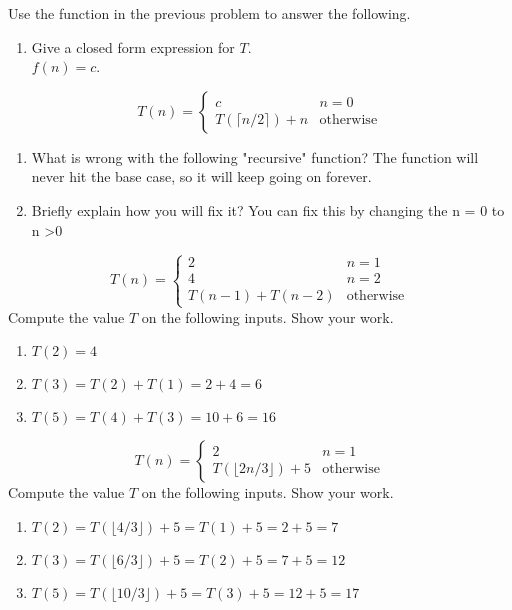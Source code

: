 \documentclass[12pt]{article}
\newenvironment{problem}[2][Problem]{\begin{trivlist}
\item[\hskip \labelsep {\bfseries #1}\hskip \labelsep {\bfseries #2.}]}{\end{trivlist}}
\begin{document}
\begin{problem}{4}
Use the function in the previous problem to answer the following.
\begin{enumerate}
 \item Give a closed form expression for $T$.\\
 $f(n) = c$.
\end{enumerate}
\end{problem}

\begin{problem}{5}
$$T(n) = \begin{cases}
      c  & n = 0 \\
      T(\lceil n/2 \rceil) + n & \text{otherwise}
 \end{cases}$$
 
\begin{enumerate}
\item What is wrong with the following "recursive" function? \newline 
    The function will never hit the base case, so it will keep going on forever.
\item Briefly explain how you will fix it? \newline
    You can fix this by changing the n = 0 to n \textgreater  0
\end{enumerate}
\end{problem}

\begin{problem}{6}
$$T(n) = \begin{cases}
      2  & n = 1 \\
      4  & n = 2 \\
      T(n-1) + T(n-2) & \text{otherwise}
 \end{cases}$$
Compute the value $T$ on the following inputs. Show your work.
\begin{enumerate}
\item $T(2) = 4$
\item $T(3) = T(2) + T(1) = 2 + 4 = 6$
\item $T(5) = T(4) + T(3) = 10 + 6 = 16$
\end{enumerate}
\end{problem}

\begin{problem}{7}
$$T(n) = \begin{cases}
      2  & n = 1 \\
      T(\lfloor 2n/3 \rfloor) + 5 & \text{otherwise}
 \end{cases}$$
Compute the value $T$ on the following inputs. Show your work.
\begin{enumerate}
\item $T(2) = T(\lfloor 4/3 \rfloor) + 5 = T(1) + 5 = 2 + 5 = 7$
\item $T(3) = T(\lfloor 6/3 \rfloor) + 5 = T(2) + 5 = 7 + 5 = 12$
\item $T(5) = T(\lfloor 10/3 \rfloor) + 5 = T(3) + 5 = 12 + 5 = 17$
\end{enumerate}
\end{problem}
\end{document}
